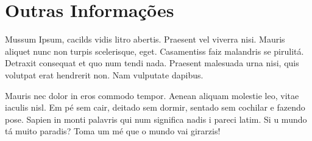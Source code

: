 \documentclass[a4paper]{twentysecondcv} %
\begin{document}




\begin{twenty} %
\end{twenty}


\section{Outras Informações}

Mussum Ipsum, cacilds vidis litro abertis. Praesent vel viverra nisi. Mauris aliquet nunc non turpis scelerisque, eget. Casamentiss faiz malandris se pirulitá. Detraxit consequat et quo num tendi nada. Praesent malesuada urna nisi, quis volutpat erat hendrerit non. Nam vulputate dapibus.

Mauris nec dolor in eros commodo tempor. Aenean aliquam molestie leo, vitae iaculis nisl. Em pé sem cair, deitado sem dormir, sentado sem cochilar e fazendo pose. Sapien in monti palavris qui num significa nadis i pareci latim. Si u mundo tá muito paradis? Toma um mé que o mundo vai girarzis!
\end{document}
